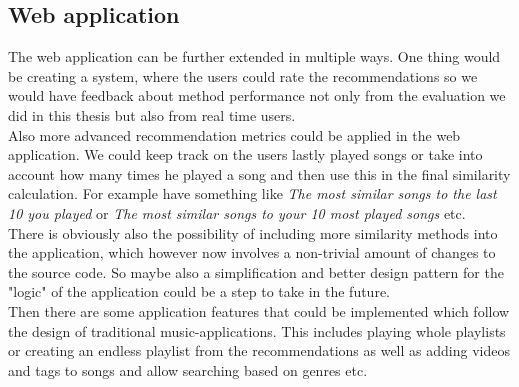 \subsection*{Web application}
The web application can be further extended in multiple ways. One thing would be creating a system, where the users could rate the recommendations so we would have feedback about method performance not only from the evaluation we did in this thesis but also from real time users. \\
Also more advanced recommendation metrics could be applied in the web application. We could keep track on the users lastly played songs or take into account how many times he played a song and then use this in the final similarity calculation. For example have something like \textit{The most similar songs to the last 10 you played} or \textit{The most similar songs to your 10 most played songs} etc. \\
There is obviously also the possibility of including more similarity methods into the application, which however now involves a non-trivial amount of changes to the source code. So maybe also a simplification and better design pattern for the "logic" of the application could be a step to take in the future. \\
Then there are some application features that could be implemented which follow the design of traditional music-applications. This includes playing whole playlists or creating an endless playlist from the recommendations as well as adding videos and tags to songs and allow searching based on genres etc. \\

